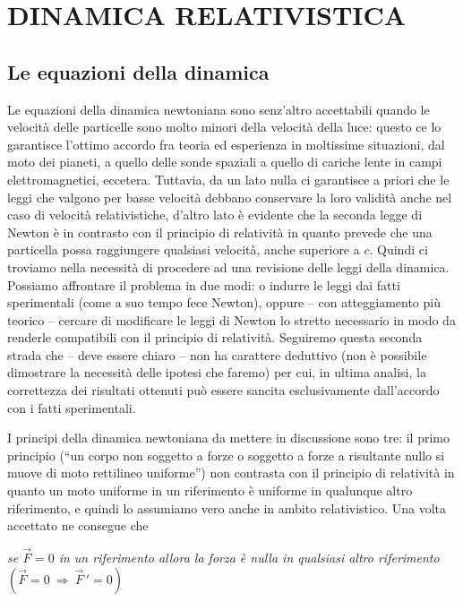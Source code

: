 \section{DINAMICA RELATIVISTICA}

\subsection{Le equazioni della dinamica}

Le equazioni della dinamica newtoniana sono senz'altro accettabili quando le
velocit\`a delle particelle sono molto minori della velocit\`a della luce:
questo ce lo garantisce l'ottimo accordo fra teoria ed esperienza in moltissime
situazioni, dal moto dei pianeti, a quello delle sonde spaziali a quello di
cariche lente in campi elettromagnetici, eccetera. Tuttavia, da un lato nulla ci
garantisce a priori che le leggi che valgono per basse velocit\`a debbano
conservare la loro validit\`a anche nel caso di velocit\`a relativistiche,
d'altro lato \`e evidente che la seconda legge di Newton \`e in contrasto con il
principio di relativit\`a in quanto prevede che una particella possa raggiungere
qualsiasi velocit\`a, anche superiore a $c$. Quindi ci troviamo nella
necessit\`a di procedere ad una revisione delle leggi della dinamica.\\
Possiamo affrontare il problema in due modi: o indurre le leggi dai fatti
sperimentali (come a suo tempo fece Newton), oppure -- con atteggiamento pi\`u
teorico -- cercare di modificare le leggi di Newton lo stretto necessario in
modo da renderle compatibili con il principio di relativit\`a. Seguiremo questa
seconda strada che -- deve essere chiaro -- non ha carattere deduttivo (non \`e
possibile dimostrare la necessit\`a delle ipotesi che faremo) per cui, in ultima
analisi, la correttezza dei risultati ottenuti pu\`o essere sancita
esclusivamente dall'accordo con i fatti sperimentali.

I principi della dinamica newtoniana da mettere in discussione sono tre: il
primo principio (``un corpo non soggetto a forze o soggetto a forze a risultante
nullo si muove di moto rettilineo uniforme'') non contrasta con il principio di
relativit\`a in quanto un moto uniforme in un riferimento \`e uniforme in
qualunque altro riferimento, e quindi lo assumiamo vero anche in ambito
relativistico. Una volta accettato ne consegue che

\textit{se $\vec F=0$ in un riferimento allora la forza \`e nulla in qualsiasi
altro riferimento \ $(\vec F=0\ \Rightarrow\ \vec F\,'=0)$}

